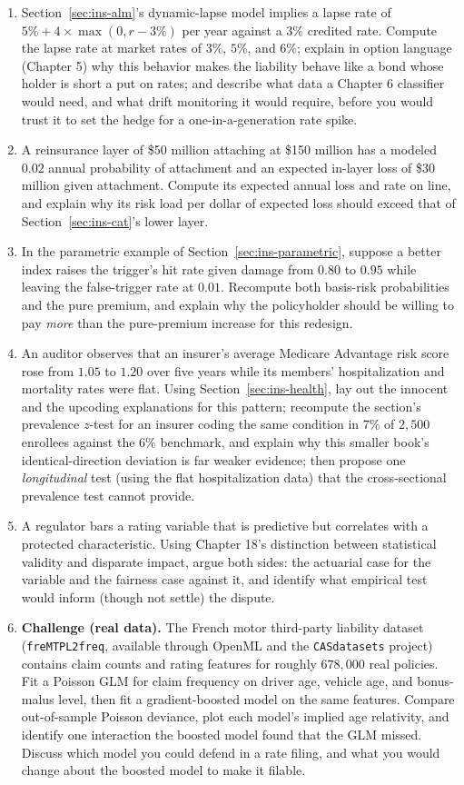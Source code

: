 \documentclass[../ai_in_finance]{subfiles}
\begin{document}
\begin{enumerate}
\item Section~\ref{sec:ins-alm}'s dynamic-lapse model implies a lapse rate of $5\% + 4 \times \max(0, r - 3\%)$ per year against a $3\%$ credited rate. Compute the lapse rate at market rates of $3\%$, $5\%$, and $6\%$; explain in option language (Chapter 5) why this behavior makes the liability behave like a bond whose holder is short a put on rates; and describe what data a Chapter 6 classifier would need, and what drift monitoring it would require, before you would trust it to set the hedge for a one-in-a-generation rate spike.
\item A reinsurance layer of \$50 million attaching at \$150 million has a modeled $0.02$ annual probability of attachment and an expected in-layer loss of \$30 million given attachment. Compute its expected annual loss and rate on line, and explain why its risk load per dollar of expected loss should exceed that of Section~\ref{sec:ins-cat}'s lower layer.
\item In the parametric example of Section~\ref{sec:ins-parametric}, suppose a better index raises the trigger's hit rate given damage from $0.80$ to $0.95$ while leaving the false-trigger rate at $0.01$. Recompute both basis-risk probabilities and the pure premium, and explain why the policyholder should be willing to pay \emph{more} than the pure-premium increase for this redesign.
\item An auditor observes that an insurer's average Medicare Advantage risk score rose from $1.05$ to $1.20$ over five years while its members' hospitalization and mortality rates were flat. Using Section~\ref{sec:ins-health}, lay out the innocent and the upcoding explanations for this pattern; recompute the section's prevalence $z$-test for an insurer coding the same condition in $7\%$ of $2{,}500$ enrollees against the $6\%$ benchmark, and explain why this smaller book's identical-direction deviation is far weaker evidence; then propose one \emph{longitudinal} test (using the flat hospitalization data) that the cross-sectional prevalence test cannot provide.
\item A regulator bars a rating variable that is predictive but correlates with a protected characteristic. Using Chapter 18's distinction between statistical validity and disparate impact, argue both sides: the actuarial case for the variable and the fairness case against it, and identify what empirical test would inform (though not settle) the dispute.
\item \textbf{Challenge (real data).} The French motor third-party liability dataset (\texttt{freMTPL2freq}, available through OpenML and the \texttt{CASdatasets} project) contains claim counts and rating features for roughly $678{,}000$ real policies. Fit a Poisson GLM for claim frequency on driver age, vehicle age, and bonus-malus level, then fit a gradient-boosted model on the same features. Compare out-of-sample Poisson deviance, plot each model's implied age relativity, and identify one interaction the boosted model found that the GLM missed. Discuss which model you could defend in a rate filing, and what you would change about the boosted model to make it filable.
\end{enumerate}
\end{document}
